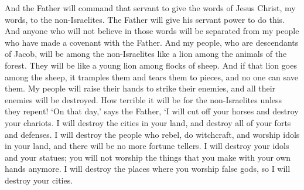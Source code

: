 And the Father will command that servant to give the words of Jesus Christ, my words, to the non-Israelites. The Father will give his servant power to do this. And anyone who will not believe in those words will be separated from my people who have made a covenant with the Father.
\bverse \iffalse And my people who are a remnant of Jacob shall be among the Gentiles, yea, in the midst of them as a lion among the beasts of the forest, as a young lion among the flocks of sheep, who, if he go through both treadeth down and teareth in pieces, and none can deliver. \fi
And my people, who are descendants of Jacob, will be among the non-Israelites like a lion among the animals of the forest. They will be like a young lion among flocks of sheep. And if that lion goes among the sheep, it tramples them and tears them to pieces, and no one can save them.
\bverse \iffalse Their hand shall be lifted up upon their adversaries, and all their enemies shall be cut off. \fi
My people will raise their hands to strike their enemies, and all their enemies will be destroyed.
\bverse \iffalse Yea, wo be unto the Gentiles except they repent; for it shall come to pass in that day, saith the Father, that I will cut off thy horses out of the midst of thee, and I will destroy thy chariots; \fi
How terrible it will be for the non-Israelites unless they repent! \lq On that day,\rq{} says the Father, \lq I will cut off your horses and destroy your chariots.
\bverse \iffalse And I will cut off the cities of thy land, and throw down all thy strongholds; \fi
I will destroy the cities in your land, and destroy all of your forts and defenses.
\bverse \iffalse And I will cut off witchcrafts out of thy land, and thou shalt have no more soothsayers; \fi
I will destroy the people who rebel, do witchcraft, and worship idols in your land, and there will be no more fortune tellers.
\bverse \iffalse Thy graven images I will also cut off, and thy standing images out of the midst of thee, and thou shalt no more worship the works of thy hands; \fi
I will destroy your idols and your statues; you will not worship the things that you make with your own hands anymore.
\bverse \iffalse And I will pluck up thy groves out of the midst of thee; so will I destroy thy cities. \fi
I will destroy the places where you worship false gods, so I will destroy your cities.
\bverse \iffalse And it shall come to pass that all lyings, and deceivings, and envyings, and strifes, and priestcrafts, and whoredoms, shall be done away. \fi
